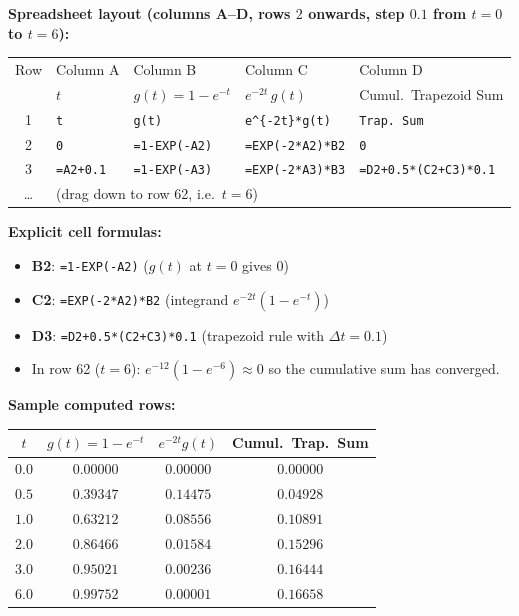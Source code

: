 \documentclass[12pt,a4paper]{article}
\begin{document}
\medskip
\noindent\textbf{Spreadsheet layout (columns A--D, rows $2$ onwards, step $0.1$
from $t = 0$ to $t = 6$):}

\begin{center}
\begin{tabular}{cllll}
\toprule
Row & Column A & Column B & Column C & Column D \\
    & $t$      & $g(t) = 1 - e^{-t}$ & $e^{-2t}\,g(t)$ & Cumul.\ Trapezoid Sum \\
\midrule
1   & \texttt{t} & \texttt{g(t)} & \texttt{e\textasciicircum\{-2t\}*g(t)} & \texttt{Trap.\ Sum} \\
2   & \texttt{0} & \texttt{=1-EXP(-A2)} & \texttt{=EXP(-2*A2)*B2} & \texttt{0} \\
3   & \texttt{=A2+0.1} & \texttt{=1-EXP(-A3)} & \texttt{=EXP(-2*A3)*B3} &
      \texttt{=D2+0.5*(C2+C3)*0.1} \\
\ldots & \multicolumn{4}{l}{(drag down to row 62, i.e.\ $t = 6$)} \\
\bottomrule
\end{tabular}
\end{center}

\noindent\textbf{Explicit cell formulas:}
\begin{itemize}
  \item \textbf{B2}: \texttt{=1-EXP(-A2)} \quad ($g(t)$ at $t = 0$ gives $0$)
  \item \textbf{C2}: \texttt{=EXP(-2*A2)*B2} \quad (integrand $e^{-2t}(1-e^{-t})$)
  \item \textbf{D3}: \texttt{=D2+0.5*(C2+C3)*0.1} \quad (trapezoid rule with $\Delta t = 0.1$)
  \item In row 62 ($t = 6$): $e^{-12}(1 - e^{-6}) \approx 0$ so the cumulative sum has
    converged.
\end{itemize}

\noindent\textbf{Sample computed rows:}

\begin{center}
\begin{tabular}{cccc}
\toprule
$t$ & $g(t) = 1-e^{-t}$ & $e^{-2t}g(t)$ & Cumul.\ Trap.\ Sum \\
\midrule
$0.0$ & $0.00000$ & $0.00000$ & $0.00000$ \\
$0.5$ & $0.39347$ & $0.14475$ & $0.04928$ \\
$1.0$ & $0.63212$ & $0.08556$ & $0.10891$ \\
$2.0$ & $0.86466$ & $0.01584$ & $0.15296$ \\
$3.0$ & $0.95021$ & $0.00236$ & $0.16444$ \\
$6.0$ & $0.99752$ & $0.00001$ & $0.16658$ \\
\bottomrule
\end{tabular}
\end{center}
\end{document}
